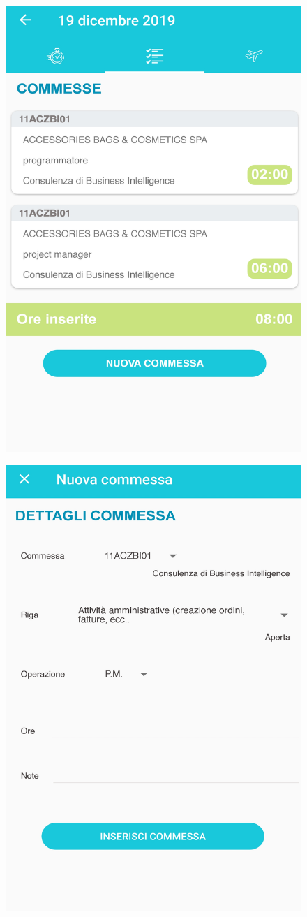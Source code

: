 \documentclass[12pt]{report}
\begin{document}
\begin{multicols}{2}
	\begin{figure}[H]
	\centering
	\includegraphics[width=0.8\linewidth]{immagini/commesse}
	\caption{}
	\label{fig:commesse}
	\end{figure}
	\begin{figure}[H]
			\centering
		\includegraphics[width=0.8\linewidth]{immagini/commesse_dettaglio}

\end{figure}
\end{multicols}
\end{document}
